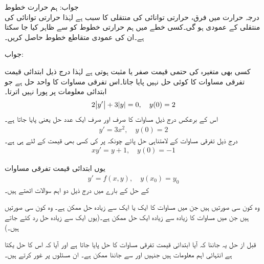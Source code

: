 جواب: 
\quad ہم حرارت خطوط\\
درجہ حرارت میں فرق، حرارتی توانائی کی منتقلی کا سبب ہے لہٰذا  حرارتی توانائی کی منتقلی  کے عمودی ہو گی۔کسی خطے میں ہم حرارتی خطوط کو  سے ظاہر کیا جا سکتا ہے۔ان کی عمودی متقاطع خطوط حاصل کریں۔

جواب:

کسی بھی متغیرہ کی حتمی قیمت صفر یا مثبت  ہوتی ہے لہٰذا درج ذیل ابتدائی قیمت تفرقی مساوات کا کوئی حل نہیں پایا جاتا۔اس تفرقی مساوات کا واحد حل  ہے جو ابتدائی معلومات پر پورا نہیں اترتا۔
\begin{align*}
2\abs{y'}+3\abs{y}=0, \quad y(0)=2
\end{align*}
اس کے برعکس درج ذیل مساوات کا صرف اور صرف ایک عدد حل یعنی  پایا جاتا ہے۔
\begin{align*}
y'=3x^2,\quad y(0)=2
\end{align*}
درج ذیل تفرقی مساوات کے  لامتناہی حل  پائے چونکہ  پر  کی کسی بھی قیمت کے لئے  ہی ہے۔
\begin{align*}
xy'=y+1,\quad y(0)=-1
\end{align*}  

یوں ابتدائی قیمت تفرقی مساوات 
\begin{align}\label{مساوات_سادہ_اول_وجودیت_حل_الف}
y'=f(x,y),\quad y(x_0)=y_0
\end{align}
کے حل کے بارے میں درج ذیل دو اہم سوالات اٹھتے ہیں۔ 

\begin{description}
 وہ کون سی صورتیں ہیں جن میں مساوات  کا ایک یا ایک سے زیادہ حل ممکن ہے۔
  وہ کون سی صورتیں ہیں جن میں مساوات   کا زیادہ سے زیادہ ایک حل ممکن ہے۔(یوں ایک سے زیادہ حل رد کئے جاتے ہیں۔)
\end{description}

قبل از حل یہ جاننا کہ آیا ابتدائی قیمت تفرقی مساوات کا حل پایا جاتا ہے اور آیا کہ اس کا حل یکتا ہے  انتہائی اہم معلومات ہیں جنہیں  اور  سے جاننا ممکن ہے۔ ان مسئلوں پر غور کرتے ہیں۔

